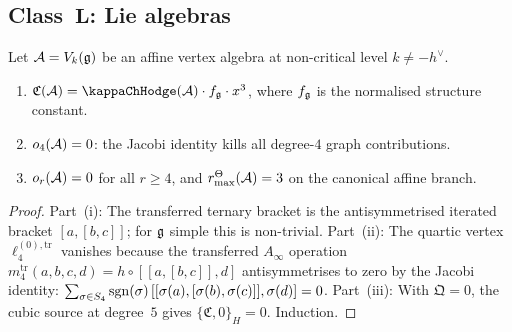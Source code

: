 
\subsection{Class~$\mathbf{L}$: Lie algebras}

\begin{theorem}
\ClaimStatusProvedHere
{}
Let $\mathcal{A} = V_k(\mathfrak{g})$ be an affine vertex algebra
at non-critical level $k \neq -h^\vee$.
\begin{enumerate}[label=\textup{(\roman*)}]
\item $\mathfrak{C}(\cA) = \kappaChHodge(\cA)\cdot f_\fg\cdot x^3$,
 where $f_{\mathfrak{g}}$ is the normalised structure constant.
\item $o_4(\mathcal{A}) = 0$: the Jacobi identity kills all
 degree-$4$ graph contributions.
\item \(o_r(\mathcal{A})=0\) for all \(r\ge4\), and
 \(r^\Theta_{\max}(\mathcal{A})=3\) on the canonical affine branch.
\end{enumerate}
\end{theorem}

\begin{proof}
Part~(i): The transferred ternary bracket is the
antisymmetrised iterated bracket $[a,[b,c]]$; for $\mathfrak{g}$
simple this is non-trivial. Part~(ii): The quartic vertex
$\ell_4^{(0),\mathrm{tr}}$ vanishes because the transferred
$A_\infty$ operation $m_4^{\mathrm{tr}}(a,b,c,d) =
h \circ [[a,[b,c]],d]$ antisymmetrises to zero by the Jacobi
identity: $\sum_{\sigma \in S_4} \operatorname{sgn}(\sigma)\,
[[\sigma(a),[\sigma(b),\sigma(c)]],\sigma(d)] = 0$.
Part~(iii): With $\mathfrak{Q} = 0$, the cubic source at
degree~$5$ gives $\{\mathfrak{C}, 0\}_H = 0$. Induction.
\end{proof}

